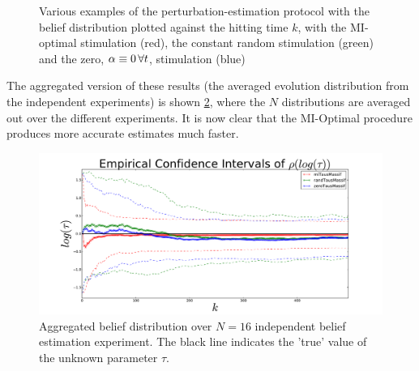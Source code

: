 \documentclass{article}
\begin{document}
\begin{figure}[h]
\begin{center}
{}
\caption[labelInTOC]{Various examples of the perturbation-estimation protocol
with the belief distribution plotted against the hitting time $k$,  with the
MI-optimal stimulation (red), the constant random stimulation (green) and the zero, ${\alpha}\equiv 0\,\forall t$, stimulation (blue)}
\label{fig:online_optimization_more_examples}
\end{center}
\end{figure} 

The aggregated version of these results (the averaged evolution distribution
from the independent experiments) is shown
\cref{fig:online_optimization_aggregated_belief_evolution}, where the $N$
distributions are averaged out over the different experiments. It is now clear 
that the MI-Optimal procedure produces more accurate estimates much faster.
 
\begin{figure}[htp]
\begin{center}
  \includegraphics[width=\textwidth]{Figs/HTOnlineEstimator/aggregated_belief_distn_aggregated_ensemble_distn_evolution.pdf}
  \caption[Aggregated belief distribution vs. experiment hitting time index]{Aggregated belief distribution over $N=16$ independent belief estimation experiment. The black line indicates the 'true' value of the
  unknown parameter $\tau$. } 
  \label{fig:online_optimization_aggregated_belief_evolution}
\end{center}
\end{figure}
\clearpage
\end{document}
